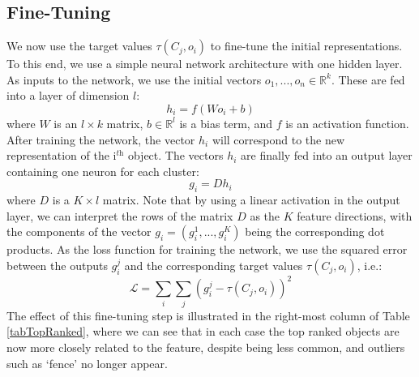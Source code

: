 \subsection{Fine-Tuning}


We now use the target values $\tau(C_j,o_i)$ to fine-tune the initial representations. To this end, we use a simple neural network architecture with one hidden layer. As inputs to the network, we use the initial vectors $o_1,...,o_n \in \mathbb{R}^k$. These are fed into a layer of dimension $l$:
$$
h_i = f(W o_i + b)
$$
where $W$ is an $l\times k$ matrix, $b\in \mathbb{R}^l$ is a bias term, and $f$ is an activation function. After training the network, the vector $h_i$ will correspond to the new representation of the i$^{\textit{th}}$ object. The vectors $h_i$ are finally fed into an output layer containing one neuron for each cluster:
$$
g_i = D h_i
$$
where $D$ is a $K \times l$ matrix. Note that by using a linear activation in the output layer, we can interpret the rows of the matrix $D$ as the $K$ feature directions, with the components of the vector $g_i = (g_i^1,...,g_i^K)$  being the corresponding dot products. %
As the loss function for training the network, we use the squared error between the outputs $g_i^j$ and the corresponding target values  $\tau(C_j,o_i)$, i.e.:
$$
\mathcal{L} = \sum_i\sum_j (g_i^j-\tau(C_j,o_i))^2
$$
The effect of this fine-tuning step is illustrated in the right-most column of Table \ref{tabTopRanked}, where we can see that in each case the top ranked objects are now more closely related to the feature, despite being less common, and outliers such as `fence' no longer appear. 


